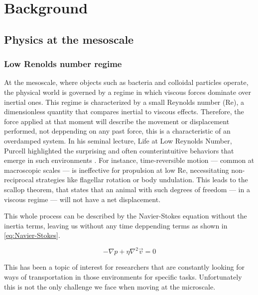 \part{Background}
\label{part:background}

\chapter{Physics at the mesoscale}
\label{ch:swimming at the mesoscale}


\section{Low Renolds number regime}
\label{st:lowreynoldsnumber}

At the mesoscale, where objects such as bacteria and colloidal particles operate, the physical world is governed by a regime in which viscous forces dominate over inertial ones. This regime is characterized by a small Reynolds number (Re), a dimensionless quantity that compares inertial to viscous effects. Therefore, the force applied at that moment will describe the movement or displacement performed, not deppending on any past force, this is a characteristic of an overdamped system. In his seminal lecture, Life at Low Reynolds Number, Purcell highlighted the surprising and often counterintuitive behaviors that emerge in such environments \cite{purcell2014life}. For instance, time-reversible motion — common at macroscopic scales — is ineffective for propulsion at low Re, necessitating non-reciprocal strategies like flagellar rotation or body undulation. This leads to the scallop theorem, that states that an animal with such degrees of freedom — in a viscous regime — will not have a net displacement. 

This whole process can be described by the Navier-Stokes equation without the inertia terms, leaving us without any time deppending terms as shown in \ref{eq:Navier-Stokes}. 

\begin{equation}
  - \nabla p + \eta \nabla ^2 \vec{v} = 0
  \label{eq:Navier-Stokes}
\end{equation}

This has been a topic of interest for researchers that are constantly looking for ways of transportation in those environments for specific tasks. Unfortunately this is not the only challenge we face when moving at the microscale.

